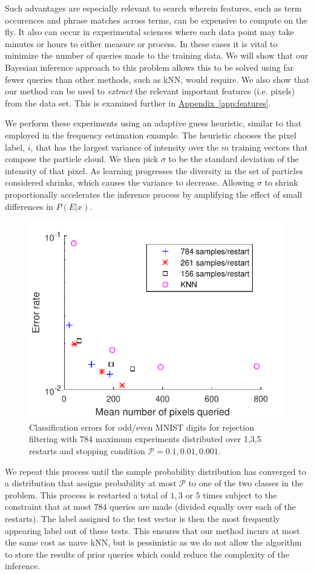 \documentclass{article} %
\newcommand{\app}[1]{\hyperref[app:#1]{Appendix~\ref*{app:#1}}}
\begin{document}
Such advantages are especially relevant to search wherein features, such as term occurences and phrase matches across terms, can be expensive to compute on the fly.  It also can
occur in experimental sciences where each data point may take minutes or hours to either measure
or process.  In these cases it is vital to minimize the number of queries made to the training
data.  We will show that our Bayesian inference approach to this problem allows this to be solved using
far fewer queries than other methods, such as kNN, would require.  We also show that our method can
be used to \emph{extract} the relevant important features (i.e. pixels) from the data set.  This is examined further in
\app{features}.

We perform these experiments using an adaptive guess heuristic, similar to that employed in the frequency estimation example.
The heuristic chooses the pixel label, $i$, that has the largest variance of intensity
over the $m$ training vectors that compose the particle cloud.  We then pick $\sigma$ to be the standard
deviation of the intensity of that pixel.  As learning progresses the diversity in the set of particles
considered shrinks, which causes the variance to decrease.  Allowing $\sigma$ to shrink proportionally accelerates the inference process by amplifying the effect of small differences in $P(E|x)$.  

\begin{figure}
\centering
\includegraphics[width=0.6\columnwidth]{ErrorPlot.pdf}
\caption{Classification errors for odd/even MNIST digits for rejection filtering with 784 maximum experiments distributed over 1,3,5 restarts and stopping condition $\mathcal{P}=0.1,0.01,0.001$.}\label{fig:errorplot}
\end{figure}

We repeat this process until the sample probability distribution has converged to a distribution that
assigns probability at most $\mathcal{P}$ to one of the two classes in the problem.  This process is restarted a total of
$1,3$ or $5$ times subject to the constraint that at most $784$ queries are made (divided equally over each of the restarts).
The label assigned to the test vector is then the most frequently appearing label out of these tests.  This ensures that our method
incurs at most the same cost as na\i ve kNN, but is pessimistic as we do not allow the algorithm to store the results of prior queries which could reduce the 
complexity of the inference.
\end{document}
